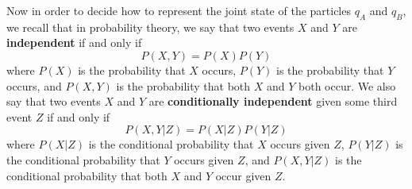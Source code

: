 Now in order to decide how to represent the joint state of the particles $q_A$ and $q_B$, we recall that  in probability theory, we say that two events $X$ and $Y$ are \textbf{independent} if and only if 
\begin{equation}\label{indep}
    P(X,Y)=P(X)P(Y)
\end{equation}
where $P(X)$ is the probability that $X$ occurs, $P(Y)$ is the probability that $Y$ occurs, and $P(X,Y)$ is the probability that both $X$ and $Y$ both occur. We also say that two events $X$ and $Y$ are \textbf{conditionally independent} given some third event $Z$ if and only if 
\begin{equation}\label{indepcond}
P(X,Y|Z)=P(X|Z)P(Y|Z)
\end{equation} where $P(X|Z)$ is the conditional probability that $X$ occurs given $Z$, $P(Y|Z)$ is the conditional probability that $Y$ occurs given $Z$, and $P(X,Y|Z)$ is the conditional probability that both $X$ and $Y$  occur given $Z$.   

